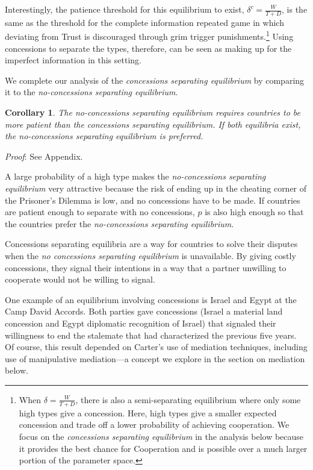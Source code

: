 \documentclass[bibtex,autowc]{apsr_submission}
\newcommand{\de}{\delta}
\newtheorem{corollary}{Corollary}
\begin{document}
Interestingly, the patience threshold for this equilibrium to exist, $\de^c = \frac{W}{T+D}$, is the same as the threshold for the complete information repeated game in which deviating from Trust is discouraged through grim trigger punishments.\footnote{When $\de = \frac{W}{T+D}$, there is also a semi-separating equilibrium where only some high types give a concession. Here, high types give a smaller expected concession and trade off a lower probability of achieving cooperation. We focus on the \emph{concessions separating equilibrium} in the analysis below because it provides the best chance for Cooperation and is possible over a much larger portion of the parameter space.} Using concessions to separate the types, therefore, can be seen as making up for the imperfect information in this setting.

We complete our analysis of the \emph{concessions separating equilibrium} by comparing it to the \emph{no-concessions separating equilibrium}.

\begin{corollary}
	The \emph{no-concessions separating equilibrium} requires countries to be more patient than the \emph{concessions separating equilibrium}. If both equilibria exist, the \emph{no-concessions separating equilibrium} is preferred.
	\label{corollary:1}
\end{corollary}
\emph{Proof}: See Appendix.

A large probability of a high type makes the \emph{no-concessions separating equilibrium} very attractive because the risk of ending up in the cheating corner of the Prisoner's Dilemma is low, and no concessions have to be made. If countries are patient enough to separate with no concessions, $p$ is also high enough so that the countries prefer the \emph{no-concessions separating equilibrium}.

Concessions separating equilibria are a way for countries to solve their disputes when the \emph{no concessions separating equilibrium} is unavailable. By giving costly concessions, they signal their intentions in a way that a partner unwilling to cooperate would not be willing to signal. 

One example of an equilibrium involving concessions is Israel and Egypt at the Camp David Accords. Both parties gave concessions (Israel a material land concession and Egypt diplomatic recognition of Israel) that signaled their willingness to end the stalemate that had characterized the previous five years. Of course, this result depended on Carter's use of mediation techniques, including use of manipulative mediation---a concept we explore in the section on mediation below. 
\end{document}
